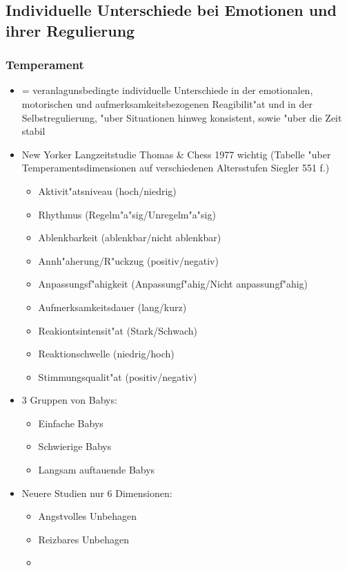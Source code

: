 \subsection{Individuelle Unterschiede bei Emotionen und ihrer Regulierung}
\subsubsection{Temperament}
\begin{itemize}
	\item
		= veranlagunsbedingte individuelle Unterschiede in der emotionalen, motorischen und aufmerksamkeitsbezogenen Reagibilit"at und in der Selbstregulierung, "uber Situationen hinweg konsistent, sowie "uber die Zeit stabil
	\item
		New Yorker Langzeitstudie Thomas \& Chess 1977 wichtig (Tabelle "uber Temperamentsdimensionen auf verschiedenen Altersstufen Siegler 551 f.)
		\begin{itemize}
			\item
				Aktivit"atsniveau (hoch/niedrig)
			\item
				Rhythmus (Regelm"a"sig/Unregelm"a"sig)
			\item
				Ablenkbarkeit (ablenkbar/nicht ablenkbar)
			\item
				Annh"aherung/R"uckzug (positiv/negativ)
			\item
				Anpassungsf"ahigkeit (Anpassungf"ahig/Nicht anpassungf"ahig)
			\item
				Aufmerksamkeitsdauer (lang/kurz)
			\item
				Reakiontsintensit"at (Stark/Schwach)
			\item
				Reaktionschwelle (niedrig/hoch)
			\item
				Stimmungsqualit"at (positiv/negativ)
		\end{itemize}
	\item
		3 Gruppen von Babys:
		\begin{itemize}
			\item
				Einfache Babys
			\item
				Schwierige Babys
			\item
				Langsam auftauende Babys
		\end{itemize}
	\item
		Neuere Studien nur 6 Dimensionen:
		\begin{itemize}
			\item
				Angstvolles Unbehagen
			\item
				Reizbares Unbehagen
			\item

\end{itemize}
\end{itemize}
